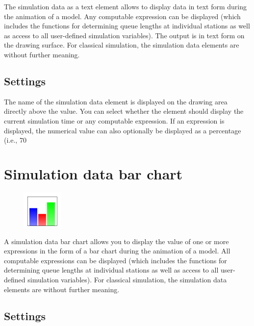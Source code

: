 The simulation data as a text element allows to display data in text form during the animation of a model.
Any computable expression can be displayed (which includes the functions for determining queue lengths at
individual stations as well as access to all user-defined simulation variables). The output is in text form
on the drawing surface. For classical simulation, the simulation data elements are without further meaning.

\subsection*{Settings}

The name of the simulation data element is displayed on the drawing area directly above the value.
You can select whether the element should display the current simulation time or any computable expression.
If an expression is displayed, the numerical value can also optionally be displayed as a percentage
(i.e., 70%


\section{Simulation data bar chart}
\label{ref:ModelElementAnimationBarChart}

\begin{figure}
\vspace{-22pt}
\includegraphics[width=2cm]{imageModelElementAnimationBarChart.png}
\vspace{-22pt}
\end{figure}

A simulation data bar chart allows you to display the value of one or more expressions
in the form of a bar chart during the animation of a model.
All computable expressions can be displayed (which includes the functions for determining queue
lengths at individual stations as well as access to all user-defined simulation variables).
For classical simulation, the simulation data elements are without further meaning.

\subsection*{Settings}

